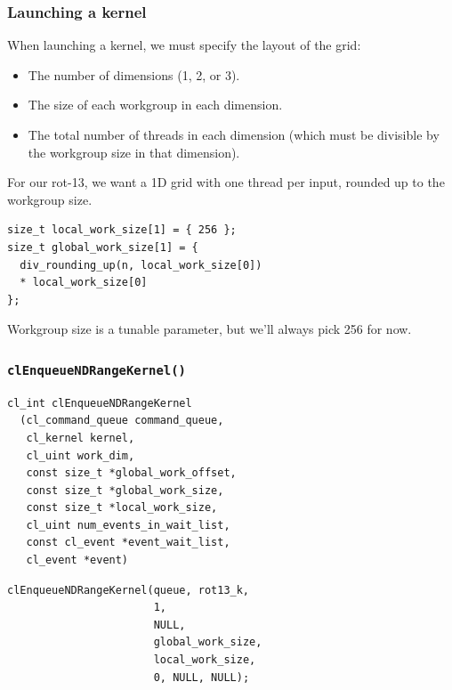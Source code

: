 \documentclass{beamer}
\begin{document}
\begin{frame}[fragile]
  \frametitle{Launching a kernel}

  When launching a kernel, we must specify the layout of the grid:

  \begin{itemize}
  \item The number of dimensions (1, 2, or 3).
  \item The size of each workgroup in each dimension.
  \item The total number of threads in each dimension (which must be
    divisible by the workgroup size in that dimension).
  \end{itemize}

  For our rot-13, we want a 1D grid with one thread per input, rounded
  up to the workgroup size.

\begin{lstlisting}
size_t local_work_size[1] = { 256 };
size_t global_work_size[1] = {
  div_rounding_up(n, local_work_size[0])
  * local_work_size[0]
};
\end{lstlisting}

Workgroup size is a tunable parameter, but we'll always pick 256 for
now.

\end{frame}

\begin{frame}
  \frametitle{\texttt{clEnqueueNDRangeKernel()}}

\begin{lstlisting}[backgroundcolor=\color{lightgray}]
cl_int clEnqueueNDRangeKernel
  (cl_command_queue command_queue,
   cl_kernel kernel,
   cl_uint work_dim,
   const size_t *global_work_offset,
   const size_t *global_work_size,
   const size_t *local_work_size,
   cl_uint num_events_in_wait_list,
   const cl_event *event_wait_list,
   cl_event *event)
\end{lstlisting}

\begin{lstlisting}
clEnqueueNDRangeKernel(queue, rot13_k,
                       1,
                       NULL,
                       global_work_size,
                       local_work_size,
                       0, NULL, NULL);
\end{lstlisting}

\end{frame}
\end{document}
